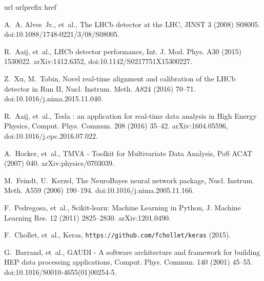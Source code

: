 \documentclass[final,5p,times,twocolumn]{elsarticle}
\def\lhcb {\mbox{LHCb}\xspace}
\begin{document}
\begin{thebibliography}{10}
\expandafter\ifx\csname url\endcsname\relax
  \def\url#1{\texttt{#1}}\fi
\expandafter\ifx\csname urlprefix\endcsname\relax\def\urlprefix{URL }\fi
\expandafter\ifx\csname href\endcsname\relax
  \def\href#1#2{#2} \def\path#1{#1}\fi

A.~A. Alves~Jr., et~al., {The \lhcb detector at the LHC}, JINST 3 (2008)
  S08005.
\newblock \href {http://dx.doi.org/10.1088/1748-0221/3/08/S08005}
  {\path{doi:10.1088/1748-0221/3/08/S08005}}.

R.~Aaij, et~al., {LHCb detector performance}, Int. J. Mod. Phys. A30 (2015)
  1530022.
\newblock \href {http://arxiv.org/abs/1412.6352} {\path{arXiv:1412.6352}},
  \href {http://dx.doi.org/10.1142/S0217751X15300227}
  {\path{doi:10.1142/S0217751X15300227}}.

Z.~Xu, M.~Tobin, {Novel real-time alignment and calibration of the LHCb
  detector in Run II}, Nucl. Instrum. Meth. A824 (2016) 70--71.
\newblock \href {http://dx.doi.org/10.1016/j.nima.2015.11.040}
  {\path{doi:10.1016/j.nima.2015.11.040}}.

R.~Aaij, et~al., {Tesla : an application for real-time data analysis in High
  Energy Physics}, Comput. Phys. Commun. 208 (2016) 35--42.
\newblock \href {http://arxiv.org/abs/1604.05596} {\path{arXiv:1604.05596}},
  \href {http://dx.doi.org/10.1016/j.cpc.2016.07.022}
  {\path{doi:10.1016/j.cpc.2016.07.022}}.

A.~Hocker, et~al., {TMVA - Toolkit for Multivariate Data Analysis}, PoS ACAT
  (2007) 040.
\newblock \href {http://arxiv.org/abs/physics/0703039}
  {\path{arXiv:physics/0703039}}.

M.~Feindt, U.~Kerzel, {The NeuroBayes neural network package}, Nucl. Instrum.
  Meth. A559 (2006) 190--194.
\newblock \href {http://dx.doi.org/10.1016/j.nima.2005.11.166}
  {\path{doi:10.1016/j.nima.2005.11.166}}.

F.~Pedregosa, et~al., {Scikit-learn: Machine Learning in Python}, J. Machine
  Learning Res. 12 (2011) 2825--2830.
\newblock \href {http://arxiv.org/abs/1201.0490} {\path{arXiv:1201.0490}}.

F.~Chollet, et~al., Keras, \url{https://github.com/fchollet/keras} (2015).

G.~Barrand, et~al., {GAUDI - A software architecture and framework for building
  HEP data processing applications}, Comput. Phys. Commun. 140 (2001) 45--55.
\newblock \href {http://dx.doi.org/10.1016/S0010-4655(01)00254-5}
  {\path{doi:10.1016/S0010-4655(01)00254-5}}.


\end{thebibliography}
\end{document}
